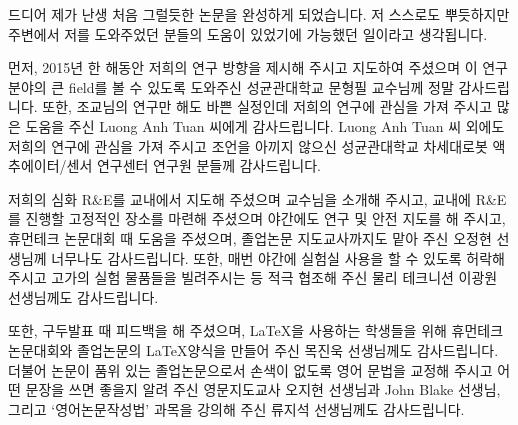 \clearpage




\begin{acknowledgements}
드디어 제가 난생 처음 그럴듯한 논문을 완성하게 되었습니다. 저 스스로도 뿌듯하지만 주변에서 저를 도와주었던 분들의 도움이 있었기에 가능했던 일이라고 생각됩니다.

먼저, 2015년 한 해동안 저희의 연구 방향을 제시해 주시고 지도하여 주셨으며 이 연구 분야의 큰 field를 볼 수 있도록 도와주신 성균관대학교 문형필 교수님께 정말 감사드립니다. 또한, 조교님의 연구만 해도 바쁜 실정인데 저희의 연구에 관심을 가져 주시고 많은 도움을 주신 Luong Anh Tuan 씨에게 감사드립니다. Luong Anh Tuan 씨 외에도 저희의 연구에 관심을 가져 주시고 조언을 아끼지 않으신 성균관대학교 차세대로봇 액추에이터/센서 연구센터 연구원 분들께 감사드립니다.

저희의 심화 R\&E를 교내에서 지도해 주셨으며 교수님을 소개해 주시고, 교내에 R\&E를 진행할 고정적인 장소를 마련해 주셨으며 야간에도 연구 및 안전 지도를 해 주시고, 휴먼테크 논문대회 때 도움을 주셨으며, 졸업논문 지도교사까지도 맡아 주신 오정현 선생님께 너무나도 감사드립니다. 또한, 매번 야간에 실험실 사용을 할 수 있도록 허락해 주시고 고가의 실험 물품들을 빌려주시는 등 적극 협조해 주신 물리 테크니션 이광원 선생님께도 감사드립니다.

또한, 구두발표 때 피드백을 해 주셨으며, \LaTeX 을 사용하는 학생들을 위해 휴먼테크논문대회와 졸업논문의 \LaTeX 양식을 만들어 주신 목진욱 선생님께도 감사드립니다. %
더불어 논문이 품위 있는 졸업논문으로서 손색이 없도록 영어 문법을 교정해 주시고 어떤 문장을 쓰면 좋을지 알려 주신 영문지도교사 오지현 선생님과 John Blake 선생님, 그리고 `영어논문작성법' 과목을 강의해 주신 류지석 선생님께도 감사드립니다.


\end{acknowledgements}
